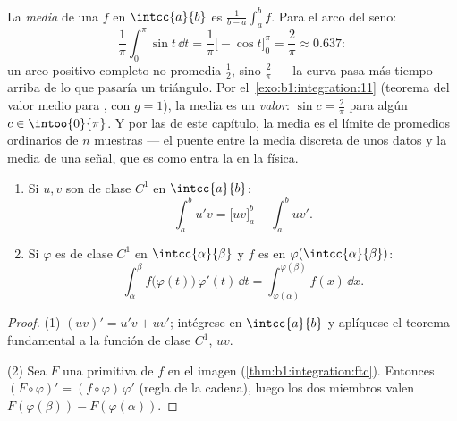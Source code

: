 \begin{example}\label{ex:b1:integration:average}
La \emph{media} de una $f$  en $\intcc{a}{b}$ es
$\frac{1}{b-a}\int_a^b f$. Para el arco del seno:
\[
\frac{1}{\pi}\int_0^\pi \sin t\,\dd t
= \frac{1}{\pi}\bigl[-\cos t\bigr]_0^\pi = \frac{2}{\pi}
\approx 0.637 :
\]
un arco positivo completo no promedia $\frac12$, sino $\frac2\pi$ ---
la curva pasa más tiempo arriba de lo que pasaría un triángulo. Por
el~\cref{exo:b1:integration:11} (teorema del valor medio para
, con $g = 1$), la media es un \emph{valor}:
$\sin c = \frac2\pi$ para algún $c \in \intoo{0}{\pi}$. Y por las
 de este capítulo, la media es el límite de
promedios ordinarios de $n$ muestras --- el puente entre la media
discreta de unos datos y la media  de una señal, que es como
entra la  en la física.
\end{example}

\begin{theorem}\label{thm:b1:integration:parts}
\begin{enumerate}
  \item Si $u, v$ son de clase $C^1$ en
        $\intcc{a}{b}$:
        \[
        \int_a^b u'v = \bigl[uv\bigr]_a^b - \int_a^b uv' .
        \]
  \item Si $\varphi$ es de clase $C^1$ en $\intcc{\alpha}{\beta}$ y
        $f$ es  en $\varphi(\intcc{\alpha}{\beta})$:
        \[
        \int_{\alpha}^{\beta} f\bigl(\varphi(t)\bigr)\,\varphi'(t)\,
        \dd t = \int_{\varphi(\alpha)}^{\varphi(\beta)} f(x)\, \dd x .
        \]
\end{enumerate}
\end{theorem}

\begin{proof}
(1) $(uv)' = u'v + uv'$; intégrese en $\intcc{a}{b}$ y aplíquese el
teorema fundamental a la función de clase $C^1$, $uv$.

(2) Sea $F$ una primitiva de $f$ en el  imagen
(\cref{thm:b1:integration:ftc}). Entonces
$(F \circ \varphi)' = (f \circ \varphi)\,\varphi'$ (regla de la
cadena), luego los dos miembros valen
$F(\varphi(\beta)) - F(\varphi(\alpha))$.
\end{proof}

